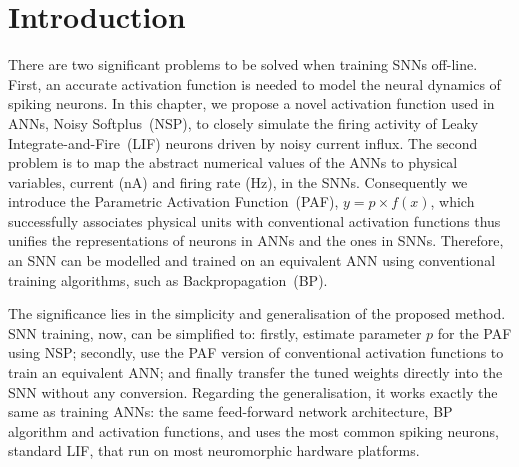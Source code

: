 \section{Introduction}
\label{sec:intro_NSP}
There are two significant problems to be solved when training SNNs off-line.
First, an accurate activation function is needed to model the neural dynamics of spiking neurons.
In this chapter, we propose a novel activation function used in ANNs, Noisy Softplus~(NSP), to closely simulate the firing activity of Leaky Integrate-and-Fire~(LIF) neurons driven by noisy current influx.
The second problem is to map the abstract numerical values of the ANNs to physical variables, current (nA) and firing rate (Hz), in the SNNs.
Consequently we introduce the Parametric Activation Function~(PAF), $y = p \times f(x)$, which successfully associates physical units with conventional activation functions thus unifies the representations of neurons in ANNs and the ones in SNNs.
Therefore, an SNN can be modelled and trained on an equivalent ANN using conventional training algorithms, such as Backpropagation~(BP).

The significance lies in the simplicity and generalisation of the proposed method.
SNN training, now, can be simplified to: firstly, estimate parameter $p$ for the PAF using NSP; secondly, use the PAF version of conventional activation functions to train an equivalent ANN; and finally transfer the tuned weights directly into the SNN without any conversion.
Regarding the generalisation, it works exactly the same as training ANNs: the same feed-forward network architecture, BP algorithm and activation functions, and uses the most common spiking neurons, standard LIF, that run on most neuromorphic hardware platforms.

